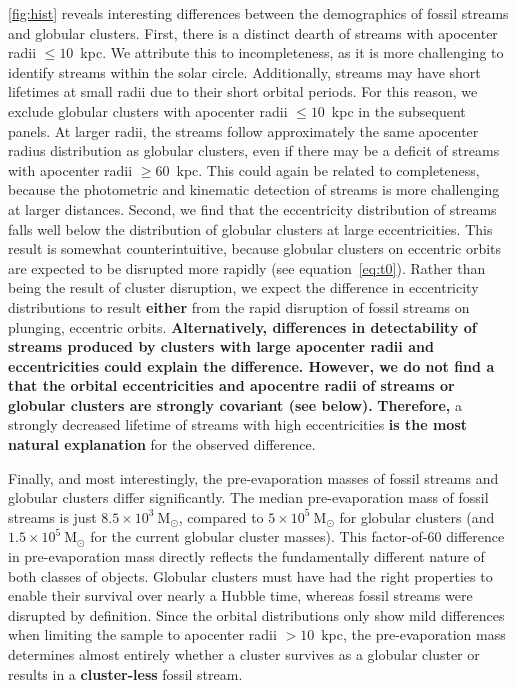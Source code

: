 \documentclass[twocolumn]{aastex63}
\newcommand{\msun}{\ensuremath{\textrm{M}_\odot}}
\newcommand{\changes}[1]{{\textbf{#1}}}
\begin{document}
\autoref{fig:hist} reveals interesting differences between the demographics of fossil streams and globular clusters.
First, there is a distinct dearth of streams with apocenter radii $\leq10$~kpc.
We attribute this to incompleteness, as it is more challenging to identify streams within the solar circle.
Additionally, streams may have short lifetimes at small radii due to their short orbital periods.
For this reason, we exclude globular clusters with apocenter radii $\leq10$~kpc in the subsequent panels.
At larger radii, the streams follow approximately the same apocenter radius distribution as globular clusters, even if there may be a deficit of streams with apocenter radii $\geq60$~kpc.
This could again be related to completeness, because the photometric and kinematic detection of streams is more challenging at larger distances.
Second, we find that the eccentricity distribution of streams falls well below the distribution of globular clusters at large eccentricities.
This result is somewhat counterintuitive, because globular clusters on eccentric orbits are expected to be disrupted more rapidly (see equation~\ref{eq:t0}).
Rather than being the result of cluster disruption, we expect the difference in eccentricity distributions to result \changes{either} from the rapid disruption of fossil streams on plunging, eccentric orbits.
\changes{Alternatively, differences in detectability of streams produced by clusters with large apocenter radii and eccentricities could explain the difference.
However, we do not find a that the orbital eccentricities and apocentre radii of streams or globular clusters are strongly covariant (see below).}
\changes{Therefore,} a strongly decreased lifetime of streams with high eccentricities \changes{is the most natural explanation} for the observed difference.

Finally, and most interestingly, the pre-evaporation masses of fossil streams and globular clusters differ significantly.
The median pre-evaporation mass of fossil streams is just $8.5\times10^3~\msun$, compared to $5\times10^5~\msun$ for globular clusters (and $1.5\times10^5~\msun$ for the current globular cluster masses).
This factor-of-60 difference in pre-evaporation mass directly reflects the fundamentally different nature of both classes of objects.
Globular clusters must have had the right properties to enable their survival over nearly a Hubble time, whereas fossil streams were disrupted by definition.
Since the orbital distributions only show mild differences when limiting the sample to apocenter radii $>10$~kpc, the pre-evaporation mass determines almost entirely whether a cluster survives as a globular cluster or results in a \changes{cluster-less} fossil stream.
\end{document}
